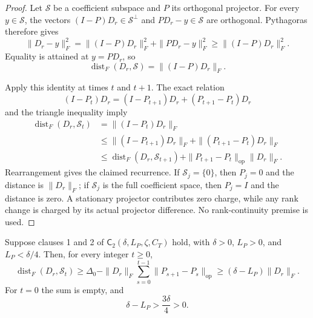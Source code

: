 \begin{proof}
Let $\mathcal S$ be a coefficient subspace and $P$ its orthogonal projector.
For every $y\in\mathcal S$, the vectors
$(I-P)D_r\in\mathcal S^\perp$ and $PD_r-y\in\mathcal S$ are orthogonal.
Pythagoras therefore gives
\[
\|D_r-y\|_F^2
=\|(I-P)D_r\|_F^2+\|PD_r-y\|_F^2
\geq\|(I-P)D_r\|_F^2.
\]
Equality is attained at $y=PD_r$, so
\[
\operatorname{dist}_F(D_r,\mathcal S)=\|(I-P)D_r\|_F.
\]

Apply this identity at times $t$ and $t+1$.  The exact relation
\[
(I-P_t)D_r=(I-P_{t+1})D_r+(P_{t+1}-P_t)D_r
\]
and the triangle inequality imply
\[
\begin{aligned}
\operatorname{dist}_F(D_r,\mathcal S_t)
&=\|(I-P_t)D_r\|_F\\
&\leq\|(I-P_{t+1})D_r\|_F
   +\|(P_{t+1}-P_t)D_r\|_F\\
&\leq\operatorname{dist}_F(D_r,\mathcal S_{t+1})
   +\|P_{t+1}-P_t\|_{\mathrm{op}}\|D_r\|_F.
\end{aligned}
\]
Rearrangement gives the claimed recurrence.  If $\mathcal S_j=\{0\}$,
then $P_j=0$ and the distance is $\|D_r\|_F$; if $\mathcal S_j$ is the
full coefficient space, then $P_j=I$ and the distance is zero.  A stationary
projector contributes zero charge, while any rank change is charged by its
actual projector difference.  No rank-continuity premise is used.
\end{proof}

\begin{proposition}
\label{prop:step-002-all-time-deficit}
Suppose clauses 1 and 2 of
$\mathsf C_2(\delta,L_P,\zeta,C_T)$ hold, with
$\delta>0$, $L_P>0$, and $L_P<\delta/4$.  Then, for every integer
$t\geq0$,
\[
\operatorname{dist}_F(D_r,\mathcal S_t)
\geq
\Delta_0-\|D_r\|_F
\sum_{s=0}^{t-1}\|P_{s+1}-P_s\|_{\mathrm{op}}
\geq(\delta-L_P)\|D_r\|_F.
\]
For $t=0$ the sum is empty, and
\[
\delta-L_P>\frac{3\delta}{4}>0.
\]
\end{proposition}

